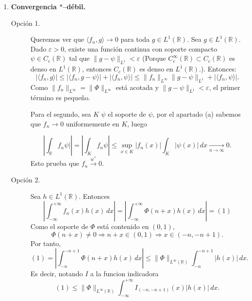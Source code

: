 \documentclass[12pt]{article}
\newcommand{\norma}[1]{\lVert #1 \rVert}
\begin{document}
\begin{ejercicio}[4 puntos ]
\begin{enumerate}
    Por otra parte, usando nuevamente que el soporte de $\Phi$ está contenido en $(0,1)$,
    para todo $p\in[1,\infty)$ se tiene
    \[
    \|f_n\|_{L^p(\mathbb{R})}^p
    = \int_{-\infty}^{+\infty} |f_n(x)|^p\,dx
    \overset{\Phi\ge 0}{=} \int_{-\infty}^{+\infty} \Phi(n+x)^p\,dx.
    \overset{y=n+x}{=} \int_{-\infty}^{+\infty} \Phi(y)^p\,dy
    = \int_0^1 \Phi(y)^p\,dy,
    \]
    que es una constante independiente de $n\in\mathbb{N}$ y estrictamente positiva
    porque $\Phi$ no es idénticamente nula.
    
    \item \textbf{Convergencia $\ast$--débil.}
        \begin{description}
        \item[Opción 1.] Queremos ver que $\langle f_n, g \rangle \to 0$ para toda $g \in L^1(\mathbb{R})$.
            Sea $g \in L^1(\mathbb{R})$. Dado $\varepsilon > 0$, existe una función continua con soporte compacto $\psi \in C_c(\mathbb{R})$ tal que $\norma{g - \psi}_{L^1} < \varepsilon$ (Porque $C_c^\infty(\mathbb{R}) \subset C_c(\mathbb{R})$ es denso en $L^1(\mathbb{R})$, entonces $C_c(\mathbb{R})$ es denso en $L^1(\mathbb{R})$.). Entonces:
            \[
            |\langle f_n, g \rangle| \le |\langle f_n, g - \psi \rangle| + |\langle f_n, \psi \rangle| \le \norma{f_n}_{L^\infty} \norma{g - \psi}_{L^1} + |\langle f_n, \psi \rangle|.
            \]
            Como $\norma{f_n}_{L^\infty} = \norma{\Phi}_{L^\infty}$ está acotada y $\norma{g - \psi}_{L^1} < \varepsilon$, el primer término es pequeño.
            
            Para el segundo, sea $K$ $\psi$ el soporte de $\psi$, por el apartado (a) sabemos que $f_n \to 0$ uniformemente en $K$, luego
                
            \[
            \left| \int_{\mathbb{R}} f_n \psi| \right|
            = \left|\int_K f_n \psi \right|
            \le \sup_{x \in K} |f_n(x)| 
            \int_K |\psi(x)|\, dx 
            \xrightarrow[n \to \infty]{} 0.
            \]
            Esto prueba que $f_n \xrightarrow{w^*} 0$.
            
        \item[Opción 2.]Sea $h\in L^1(\mathbb{R})$. Entonces
            \[
            \left| \int_{-\infty}^{+\infty} f_n(x)h(x)\,dx \right|
            = \left| \int_{-\infty}^{+\infty} \Phi(n+x)h(x)\,dx \right| = ({1})
            \]
            Como el soporte de $\Phi$ está contenido en $(0,1)$,
            \[
            \Phi(n+x)\neq 0 \Longrightarrow n+x\in(0,1)
            \Longrightarrow x\in(-n,-n+1).
            \]
            Por tanto,
            \[
            (1) = \left| \int_{-n}^{-n+1} \Phi(n+x)h(x)\,dx \right|
            \le \|\Phi\|_{L^\infty(\mathbb{R})}
            \int_{-n}^{-n+1} |h(x)|\,dx.
            \]
            Es decir, notando $I$ a la funcion indicadora
            \[
            (1) \le \|\Phi\|_{L^\infty(\mathbb{R})}
            \int_{-\infty}^{+\infty}
            I_{(-n,-n+1)}(x)|h(x)|\,dx. 
            \]
            

\end{description}
\end{enumerate}
\end{ejercicio}
\end{document}
